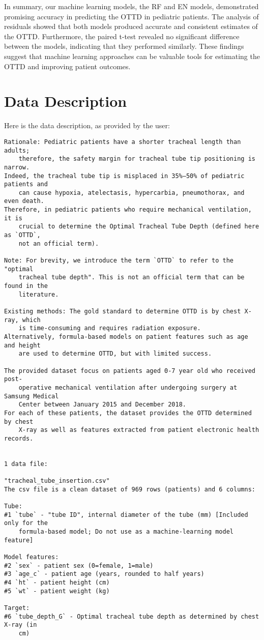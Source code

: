 \documentclass[11pt]{article}
\begin{document}
In summary, our machine learning models, the RF and EN models, demonstrated promising accuracy in predicting the OTTD in pediatric patients. The analysis of residuals showed that both models produced accurate and consistent estimates of the OTTD. Furthermore, the paired t-test revealed no significant difference between the models, indicating that they performed similarly. These findings suggest that machine learning approaches can be valuable tools for estimating the OTTD and improving patient outcomes.


\clearpage
\appendix

\section{Data Description} \label{sec:data_description} Here is the data description, as provided by the user:

\begin{Verbatim}[tabsize=4]
Rationale: Pediatric patients have a shorter tracheal length than adults;
	therefore, the safety margin for tracheal tube tip positioning is narrow.
Indeed, the tracheal tube tip is misplaced in 35%–50% of pediatric patients and
	can cause hypoxia, atelectasis, hypercarbia, pneumothorax, and even death.
Therefore, in pediatric patients who require mechanical ventilation, it is
	crucial to determine the Optimal Tracheal Tube Depth (defined here as `OTTD`,
	not an official term).

Note: For brevity, we introduce the term `OTTD` to refer to the "optimal
	tracheal tube depth". This is not an official term that can be found in the
	literature.

Existing methods: The gold standard to determine OTTD is by chest X-ray, which
	is time-consuming and requires radiation exposure.
Alternatively, formula-based models on patient features such as age and height
	are used to determine OTTD, but with limited success.

The provided dataset focus on patients aged 0-7 year old who received post-
	operative mechanical ventilation after undergoing surgery at Samsung Medical
	Center between January 2015 and December 2018.
For each of these patients, the dataset provides the OTTD determined by chest
	X-ray as well as features extracted from patient electronic health records.


1 data file:

"tracheal_tube_insertion.csv"
The csv file is a clean dataset of 969 rows (patients) and 6 columns:

Tube:
#1 `tube` - "tube ID", internal diameter of the tube (mm) [Included only for the
	formula-based model; Do not use as a machine-learning model feature]

Model features:
#2 `sex` - patient sex (0=female, 1=male)
#3 `age_c` - patient age (years, rounded to half years)
#4 `ht` - patient height (cm)
#5 `wt` - patient weight (kg)

Target:
#6 `tube_depth_G` - Optimal tracheal tube depth as determined by chest X-ray (in
	cm)



\end{Verbatim}
\end{document}
